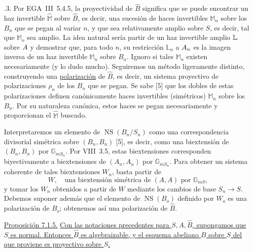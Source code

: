 
\medskip
{}.3. Por EGA~III~5.4.5, la proyectividad de $\widehat B$ significa
que se puede encontrar un haz invertible $\widehat{\mathbb M}$ sobre
$\widehat B$, es decir, una sucesión de haces invertibles $\mathbb M_n$
sobre los $B_n$ que se pegan al variar $n$, y que sea relativamente
amplio sobre $S$, es decir, tal que $\mathbb M_o$ sea amplio. La idea
natural sería partir de un haz invertible amplio
$\sisi{\mathbb M}{\mathbb L}$ sobre $\sisi{G}{A}$ y demostrar que, para
todo $n$, su restricción $\mathbb L_n$ a $\sisi{G_n}{A_n}$ es la imagen
inversa de un haz invertible $\mathbb M_n$ sobre $B_n$. Ignoro si tales
$\mathbb M_n$ existen necesariamente (y lo dudo mucho). Seguiremos un
método ligeramente distinto, construyendo una \underline{polarización}
de $\widehat B$, es decir, un sistema proyectivo de polarizaciones
$\rho_n$ de los $B_n$ que se pegan. Se sabe [5] que los dobles de estas
polarizaciones definen canónicamente haces invertibles (simétricos)
$\mathbb M_n$ sobre los $B_n$. Por su naturaleza canónica, estos haces
se pegan necesariamente y proporcionan el $\widehat{\mathbb M}$ buscado.

Interpretaremos un elemento de $\operatorname{NS}(B_n/S_n)$ como una
correspondencia divisorial simétrica sobre $(B_n,B_n)$ [5], es decir,
como una biextensión de $(B_n,B_n)$ por $\mathbb G_{mS_n}$. Por VIII~3.5,
estas biextensiones corresponden biyectivamente a biextensiones de
$(A_n,A_n)$ por $\mathbb G_{mS_n}$. Para obtener un sistema coherente de
tales biextensiones $W_n$, basta partir de
\begin{equation}\tag{7.1.4}
 W,\quad\text{una biextensión simétrica de $(A,A)$ por $\mathbb G_{mS}$},
\end{equation}
y tomar los $W_n$ obtenidos a partir de $W$ mediante los cambios de base
$S_n\longrightarrow S$. Debemos suponer además que el elemento de
$\operatorname{NS}(B_o)$ definido por $W_o$ es una polarización de
$B_o$; obtenemos así una polarización de $\widehat B$.


\medskip
\noindent
\underline{Proposición 7.1.5.} \underline{Con las notaciones precedentes
para $S,A,\widehat B$, supongamos que $S$ es normal. Entonces
$\widehat B$ es algebraizable, y el esquema abeliano $B$ sobre $S$ del
que proviene es proyectivo sobre $S$.}

